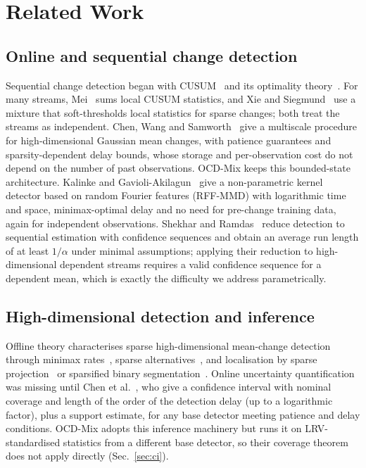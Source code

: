 \documentclass[conference]{IEEEtran}
\begin{document}
\section{Related Work}
\subsection{Online and sequential change detection}
Sequential change detection began with CUSUM~\cite{page1954} and its optimality theory~\cite{lorden1971}. For many streams, Mei~\cite{mei2010} sums local CUSUM statistics, and Xie and Siegmund~\cite{xie2013} use a mixture that soft-thresholds local statistics for sparse changes; both treat the streams as independent. Chen, Wang and Samworth~\cite{chen2022} give a multiscale procedure for high-dimensional Gaussian mean changes, with patience guarantees and sparsity-dependent delay bounds, whose storage and per-observation cost do not depend on the number of past observations. OCD-Mix keeps this bounded-state architecture. Kalinke and Gavioli-Akilagun~\cite{kalinke2025} give a non-parametric kernel detector based on random Fourier features (RFF-MMD) with logarithmic time and space, minimax-optimal delay and no need for pre-change training data, again for independent observations. Shekhar and Ramdas~\cite{shekhar2024} reduce detection to sequential estimation with confidence sequences and obtain an average run length of at least $1/\alpha$ under minimal assumptions; applying their reduction to high-dimensional dependent streams requires a valid confidence sequence for a dependent mean, which is exactly the difficulty we address parametrically.

\subsection{High-dimensional detection and inference}
Offline theory characterises sparse high-dimensional mean-change detection through minimax rates~\cite{liu2021}, sparse alternatives~\cite{enikeeva2019}, and localisation by sparse projection~\cite{wang2018} or sparsified binary segmentation~\cite{cho2015}. Online uncertainty quantification was missing until Chen et al.~\cite{chen2024}, who give a confidence interval with nominal coverage and length of the order of the detection delay (up to a logarithmic factor), plus a support estimate, for any base detector meeting patience and delay conditions. OCD-Mix adopts this inference machinery but runs it on LRV-standardised statistics from a different base detector, so their coverage theorem does not apply directly (Sec.~\ref{sec:ci}).
\end{document}
